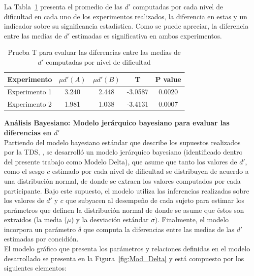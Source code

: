 La Tabla~\ref{Tabla_t-Dprimas} presenta el promedio de las $d'$ computadas por cada nivel de dificultad en cada uno de los experimentos realizados, la diferencia en estas y un indicador sobre su significancia estadística. Como se puede apreciar, la diferencia entre las medias de $d'$ estimadas es significativa en ambos experimentos.\\

\begin{table}
\caption[Prueba T para evaluar las diferencias entre las medias de $d'$ por nivel de dificultad]{Prueba T para evaluar las diferencias entre las medias de $d'$ computadas por nivel de dificultad}
\label{Tabla_t-Dprimas}
\centering
\begin{tabular}{l | c c c c}
\toprule
\textbf{Experimento} & \textbf{$\mu d'(A)$} & \textbf{$\mu d'(B)$} & \textbf{T}  & \textbf{P value}\\
\midrule
Experimento 1 & 3.240 & 2.448 & -3.0587 & 0.0020 \\
Experimento 2 & 1.981 & 1.038 & -3.4131 & 0.0007 \\
\bottomrule
\end{tabular}
\end{table}


\textbf{Análisis Bayesiano: Modelo jerárquico bayesiano para evaluar las diferencias en $d'$}\\

Partiendo del modelo bayesiano estándar que describe los supuestos realizados por la TDS, \parencite{LeeBook}, se desarrolló un modelo jerárquico bayesiano (identificado dentro del presente trabajo como Modelo Delta), que asume que tanto los valores de $d'$, como el sesgo $c$ estimado por cada nivel de dificultad se distribuyen de acuerdo a una distribución normal, de donde se extraen los valores computados por cada participante. Bajo este supuesto, el modelo utiliza las inferencias realizadas sobre los valores de $d'$ y $c$ que subyacen al desempeño de cada sujeto para estimar los parámetros que definen la distribución normal de donde se asume que éstos son extraidos (la media ($\mu$) y la desviación estándar $\sigma$). Finalmente, el modelo incorpora un parámetro $\delta$ que computa la diferencias entre las medias de las $d'$ estimadas por concidión.\\

El modelo gráfico que presenta los parámetros y relaciones definidas en el modelo desarrollado se presenta en la Figura~\ref{fig:Mod_Delta} y está compuesto por los siguientes elementos:\\

